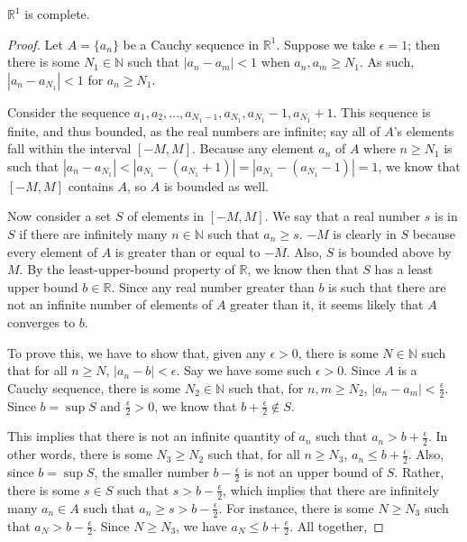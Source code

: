 \documentclass[12pt]{article}
\begin{document}
\begin{thm}
  $\mathbb{R}^1$ is complete.

  \begin{proof}
    Let $A = \{a_n\}$ be a Cauchy sequence in $\mathbb{R}^1$. Suppose we take
    $\epsilon = 1$; then there is some $N_1 \in \mathbb{N}$ such that $|a_n - a_m| <
    1$ when $a_n,a_m \geq N_1$. As such, $|a_n - a_{N_1}| < 1$ for $a_n \geq N_1$.

    Consider the sequence $a_1,a_2,\ldots,a_{N_1 - 1},a_{N_1},a_{N_1} - 1, a_{N_1} +
    1$. This sequence is finite, and thus bounded, as the real numbers are infinite;
    say all of $A$'s elements fall within the interval $[-M,M]$. Because any element
    $a_n$ of $A$ where $n \geq N_1$ is such that $|a_n - a_{N_1}| < |a_{N_1} -
    (a_{N_1} + 1)| = |a_{N_1} - (a_{N_1} - 1)| = 1$, we know that $[-M,M]$ contains
    $A$, so $A$ is bounded as well.

    Now consider a set $S$ of elements in $[-M,M]$. We say that a real number $s$ is
    in $S$ if there are infinitely many $n \in \mathbb{N}$ such that $a_n \geq s$.
    $-M$ is clearly in $S$ because every element of $A$ is greater than or equal to
    $-M$. Also, $S$ is bounded above by $M$. By the least-upper-bound property of
    $\mathbb{R}$, we know then that $S$ has a least upper bound $b \in \mathbb{R}$.
    Since any real number greater than $b$ is such that there are not an infinite
    number of elements of $A$ greater than it, it seems likely that $A$ converges to
    $b$.

    To prove this, we have to show that, given any $\epsilon > 0$, there is some $N
    \in \mathbb{N}$ such that for all $n \geq N$, $|a_n - b| < \epsilon$. Say we have
    some such $\epsilon > 0$. Since $A$ is a Cauchy sequence, there is some $N_2 \in
    \mathbb{N}$ such that, for $n,m \geq N_2$, $|a_n - a_m| < \frac{\epsilon}{2}$.
    Since $b = \sup S$ and $\frac{\epsilon}{2} > 0$, we know that $b +
    \frac{\epsilon}{2} \notin S$.

    This implies that there is not an infinite quantity of $a_n$ such that $a_n > b +
    \frac{\epsilon}{2}$. In other words, there is some $N_3 \geq N_2$ such that, for
    all $n \geq N_3$, $a_n \leq b + \frac{\epsilon}{2}$. Also, since $b = \sup S$,
    the smaller number $b - \frac{\epsilon}{2}$ is not an upper bound of $S$. Rather,
    there is some $s \in S$ such that $s > b - \frac{\epsilon}{2}$, which implies
    that there are infinitely many $a_n \in A$ such that $a_n \geq s > b -
    \frac{\epsilon}{2}$. For instance, there is some $N \geq N_3$ such that $a_N > b
    - \frac{\epsilon}{2}$. Since $N \geq N_3$, we have $a_N \leq b +
    \frac{\epsilon}{2}$. All together,


\end{proof}
\end{thm}
\end{document}
